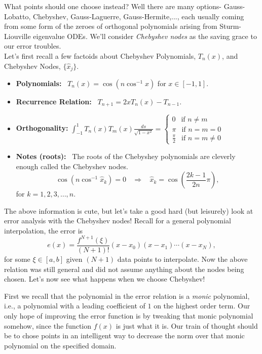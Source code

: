 \documentclass[paper=a4, fontsize=11pt]{scrartcl} %
\numberwithin{equation}{section} %
\numberwithin{figure}{section} %
\numberwithin{table}{section} %
\begin{document}
What points should one choose instead? Well there are many options- Gauss-Lobatto, Chebyshev, Gauss-Laguerre, Gauss-Hermite,..., each usually coming from some form of the zeroes of orthogonal polynomials arising from Sturm-Liouville eigenvalue ODEs. We'll consider \emph{Chebyshev nodes} as the saving grace to our error troubles. \\

Let's first recall a few factoids about Chebyshev Polynomials, $T_n(x)$, and Chebyshev Nodes, $\{\hat{x}_j\}$.

\begin{itemize}
\item {\bf{Polynomials:}} \ $T_{n}(x) = \cos\left( n \cos^{-1}x \right)$ for $x\in[-1,1]$.
\item{\bf{Recurrence Relation:}} \ $T_{n+1} = 2xT_{n}(x) - T_{n-1}$.
\item{\bf{Orthogonality:}} $\displaystyle\int_{-1}^{1} T_{n}(x) T_{m}(x) \frac{ds}{\sqrt{1-x^2}} = \left\{ \begin{array}{c}
0 \ \ \mbox{ if } n\neq m\ \ \ \ \ \ \ \\
\pi \ \ \mbox{ if } n=m=0 \\
\frac{\pi}{2} \ \ \mbox{ if } n=m\neq 0
\end{array} \right.$
\item{\bf{Notes (roots):}} \ The roots of the Chebyshey polynomials are cleverly enough called the Chebyshev nodes.$$\cos(n \cos^{-1}\hat{x}_k) = 0\ \ \ \ \Rightarrow \ \  \ \ \hat{x}_k = \cos\left( \frac{2k-1}{2n} \pi\right),$$ for $k=1,2,3,\ldots,n.$ 
\end{itemize}

The above information is cute, but let's take a good hard (but leisurely) look at error analysis with the Chebyshev nodes! Recall for a general polynomial interpolation, the error is $$e(x) = \frac{ f^{N+1}(\xi) }{(N+1)!} (x-x_0)(x-x_1)\cdots (x-x_N),$$ for some $\xi\in[a,b]$ given $(N+1)$ data points to interpolate. Now the above relation was still general and did not assume anything about the nodes being chosen. Let's now see what happens when we choose Chebyshev!

First we recall that the polynomial in the error relation is a \emph{monic} polynomial, i.e., a polynomial with a leading coefficient of $1$ on the highest order term. Our only hope of improving the error function is by tweaking that monic polynomial somehow, since the function $f(x)$ is just what it is. Our train of thought should be to chose points in an intelligent way to decrease the norm over that monic polynomial on the specified domain. \\
\end{document}

